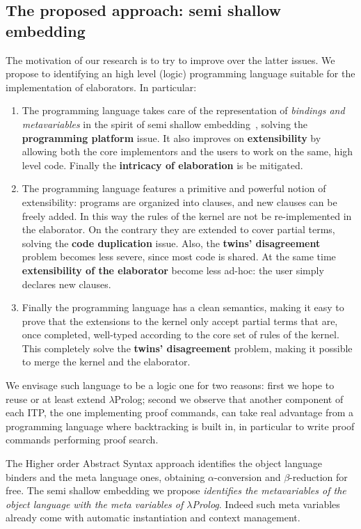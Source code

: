 \documentclass{easychair}
\begin{document}
\subsection{The proposed approach: semi shallow embedding}

The motivation of our research is to try to improve over the latter issues.  We
propose to identifying an high level (logic) programming language suitable for
the implementation of elaborators. In particular:
\begin{enumerate}
\item The programming language takes care of the representation of
	\emph{bindings and metavariables} in the spirit of semi
	shallow embedding~\cite{holsuperlight},
	solving the \textbf{programming platform} issue.
	It also improves on \textbf{extensibility} by allowing
	both the core implementors and the users to work on the same,
	high level code.
	Finally the \textbf{intricacy of elaboration} is be mitigated.
\item The programming language features a primitive and powerful
	notion of extensibility: programs are organized into clauses,
	and new clauses can be freely added.
	In this way the rules of the kernel are not be re-implemented in the
	elaborator. On the contrary they are extended to cover partial terms,
	solving the \textbf{code duplication} issue.
	Also, the \textbf{twins' disagreement} problem becomes less severe,
	since most code is shared.
	At the same time \textbf{extensibility of the elaborator}
	become less ad-hoc: the user simply declares new clauses.
\item Finally the programming language has a clean semantics, making it
	easy to prove that the extensions to the kernel
	only accept partial terms that are, once completed,
	well-typed according
	to the core set of rules of the kernel.  This completely
	solve the \textbf{twins' disagreement} problem, making it possible to
	merge the kernel and the elaborator.
\end{enumerate}

We envisage such language to be a logic one for two reasons:
first we hope to reuse or at least extend $\lambda$Prolog;
second we observe that another component of each ITP, the one
implementing proof commands, can take real advantage from a 
programming language where backtracking is built in, in
particular to write proof commands performing proof search.

The Higher order Abstract Syntax approach identifies the object
language binders and the meta language ones, obtaining $\alpha$-conversion
and $\beta$-reduction for free.  The semi shallow embedding we propose
\emph{identifies the metavariables of the object language with the 
meta variables of $\lambda$Prolog}.  Indeed such meta variables already
come with automatic instantiation and context management.
\end{document}

